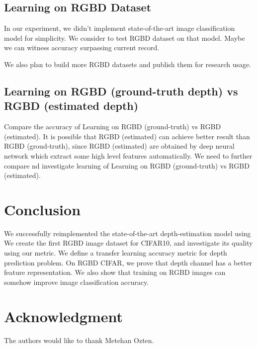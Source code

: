 \documentclass[journal]{IEEEtran}
\begin{document}
\subsection{Learning on RGBD Dataset}
In our experiment, we didn\rq{}t implement state-of-the-art image classification model \cite{he2015deep} for simplicity.
We consider to test RGBD dataset on that model. 
Maybe we can witness accuracy surpassing current record.

We also plan to build more RGBD datasets and publish them for research usage.

\subsection{Learning on RGBD (ground-truth depth) vs RGBD (estimated depth)}
Compare the accuracy of Learning on RGBD (ground-truth) vs RGBD (estimated). It is possible that RGBD (estimated) can achieve better result than RGBD (groud-truth), since RGBD (estimated) are obtained by deep neural network which extract some high level features automatically. We need to further compare nd investigate learning of Learning on RGBD (ground-truth) vs RGBD (estimated).

\section{Conclusion}
We successfully reimplemented the state-of-the-art depth-estimation model using
We create the first RGBD image dataset for CIFAR10, and investigate its quality 
using our metric.
We define a transfer learning accuracy metric for depth prediction problem.
On RGBD CIFAR, we prove that depth channel has a better feature representation.
We also show that training on RGBD images can somehow improve image 
classification accuracy.
	
	\section*{Acknowledgment}
	
	
	The authors would like to thank Metehan Ozten.
	
	
	\ifCLASSOPTIONcaptionsoff
	\newpage
	\fi
	
{\small
	\printbibliography
}
	
\end{document}
